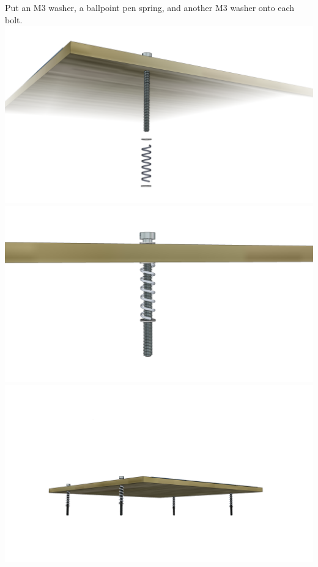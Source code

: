 \documentclass[twoside,a4paper,titlepage]{memoir}
\begin{document}
	\section{}
	Put an M3 washer, a ballpoint pen spring, and another M3 washer onto each bolt.\\
	\includegraphics[width=1\linewidth]{graphics/ch11_4_1.png}
	\includegraphics[width=1\linewidth]{graphics/ch11_4_2.png}
	\includegraphics[width=1\linewidth]{graphics/ch11_4_3.png}
	
\end{document}
